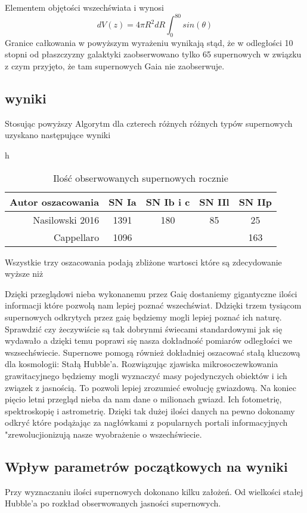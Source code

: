 \documentclass[polish,12pt]{pracamgr}
\begin{document}
 Elementem objętości wszechświata i wynosi
	\begin{equation}
	dV(z) =4 \pi R^{2} dR \int _{0}^{80} sin(\theta) 
	\end{equation}
Granice całkowania w powyższym wyrażeniu wynikają stąd, że w odległości 10 stopni od płaszczyzny galaktyki zaobserwowano tylko 65 supernowych w związku z czym przyjęto, że tam supernowych Gaia nie zaobserwuje. 
\subsection{wyniki}
Stosując powyższy Algorytm dla czterech różnych  różnych typów supernowych uzyskano następujące wyniki
\begin{table}{h}
	\caption{Ilość obserwowanych supernowych rocznie}
	\label{nazwa odnosnika, ktora potem uzyjemy do cytowania tabeli}
	\begin{tabular}{ r|c|c|c |c}
  	Autor oszacowania &  SN Ia & SN Ib i c & SN IIl & SN IIp\\ 
  	\hline
  	Nasilowski 2016 & 1391 & 180  & 85 & 25\\
	\hline
	Cappellaro & 1096 &&& 163
	\end{tabular}
	\end{table}

Wszystkie trzy oszacowania podają zbliżone wartosci które są zdecydowanie wyższe niż 

Dzięki przeglądowi nieba wykonanemu przez Gaię dostaniemy gigantyczne ilości informacji które pozwolą nam lepiej poznać wszechświat. Ddzięki trzem tysiącom supernowych odkrytych przez gaię będziemy mogli lepiej poznać ich naturę. Sprawdzić czy żeczywiście są tak dobrynmi świecami standardowymi jak się wydawało a dzięki temu poprawi się nasza dokładność pomiarów odległości we wszsechświecie. Supernowe pomogą również dokładniej oszacować stałą kluczową dla kosmologii: Stałą Hubble'a. Rozwiązując zjawiska mikrosoczewkowania grawitacyjnego będziemy mogli wyznaczyć masy pojedynczych obiektów i ich związek z jasnością. To pozwoli lepiej zrozumieć ewolucję gwiazdową. Na koniec pięcio letni przegląd nieba da nam dane o milionach gwiazd. Ich fotometrię, spektroskopię i astrometrię. Dzięki tak dużej ilości danych na pewno dokonamy odkryć które podążając za nagłówkami z popularnych portali informacyjnych "zrewolucjionizują nasze wyobrażenie o wszechświecie.
\subsection{Wpływ parametrów początkowych na wyniki}
Przy wyznaczaniu ilości supernowych dokonano kilku założeń. Od wielkości stałej Hubble’a po rozkład obserwowanych jasności supernowych.
\end{document}
